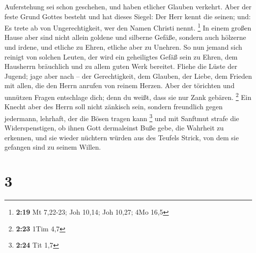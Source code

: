 Auferstehung sei schon geschehen, und haben etlicher Glauben verkehrt.
 Aber der feste Grund Gottes besteht und hat dieses
Siegel: Der Herr kennt die seinen; und: Es trete ab von Ungerechtigkeit,
wer den Namen Christi nennt. \footnote{\textbf{2:19} Mt 7,22-23; Joh
  10,14; Joh 10,27; 4Mo 16,5}  In einem großen Hause aber
sind nicht allein goldene und silberne Gefäße, sondern auch hölzerne und
irdene, und etliche zu Ehren, etliche aber zu Unehren. 
So nun jemand sich reinigt von solchen Leuten, der wird ein geheiligtes
Gefäß sein zu Ehren, dem Hausherrn bräuchlich und zu allem guten Werk
bereitet.  Fliehe die Lüste der Jugend; jage aber nach --
der Gerechtigkeit, dem Glauben, der Liebe, dem Frieden mit allen, die
den Herrn anrufen von reinem Herzen.  Aber der törichten
und unnützen Fragen entschlage dich; denn du weißt, dass sie nur Zank
gebären. \footnote{\textbf{2:23} 1Tim 4,7}  Ein Knecht
aber des Herrn soll nicht zänkisch sein, sondern freundlich gegen
jedermann, lehrhaft, der die Bösen tragen kann \footnote{\textbf{2:24}
  Tit 1,7}  und mit Sanftmut strafe die Widerspenstigen,
ob ihnen Gott dermaleinst Buße gebe, die Wahrheit zu erkennen,
 und sie wieder nüchtern würden aus des Teufels Strick,
von dem sie gefangen sind zu seinem Willen.

\hypertarget{section-2}{%
\section{3}\label{section-2}}


